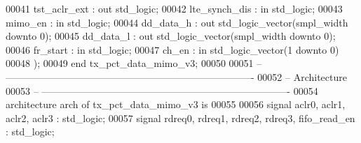 \begin{DoxyCode}
00041           \textcolor{vhdlchar}{tst_aclr_ext}          \textcolor{vhdlchar}{:} \textcolor{keywordflow}{out} \textcolor{comment}{std\_logic};
00042           \textcolor{vhdlchar}{lte_synch_dis}     \textcolor{vhdlchar}{:} \textcolor{keywordflow}{in} \textcolor{comment}{std\_logic};
00043           \textcolor{vhdlchar}{mimo_en}           \textcolor{vhdlchar}{:} \textcolor{keywordflow}{in} \textcolor{comment}{std\_logic};
00044           \textcolor{vhdlchar}{dd_data_h}         \textcolor{vhdlchar}{:} \textcolor{keywordflow}{out} \textcolor{comment}{std\_logic\_vector}\textcolor{vhdlchar}{(}\textcolor{vhdlchar}{smpl_width} \textcolor{keywordflow}{downto} \textcolor{vhdllogic}{}\textcolor{vhdllogic}{0}\textcolor{vhdlchar}{)};
00045           \textcolor{vhdlchar}{dd_data_l}         \textcolor{vhdlchar}{:} \textcolor{keywordflow}{out} \textcolor{comment}{std\_logic\_vector}\textcolor{vhdlchar}{(}\textcolor{vhdlchar}{smpl_width} \textcolor{keywordflow}{downto} \textcolor{vhdllogic}{}\textcolor{vhdllogic}{0}\textcolor{vhdlchar}{)};
00046           \textcolor{vhdlchar}{fr_start}          \textcolor{vhdlchar}{:} \textcolor{keywordflow}{in} \textcolor{comment}{std\_logic};
00047           \textcolor{vhdlchar}{ch_en}                 \textcolor{vhdlchar}{:} \textcolor{keywordflow}{in} \textcolor{comment}{std\_logic\_vector}\textcolor{vhdlchar}{(}\textcolor{vhdllogic}{}\textcolor{vhdllogic}{1} \textcolor{keywordflow}{downto} \textcolor{vhdllogic}{}\textcolor{vhdllogic}{0}\textcolor{vhdlchar}{)}
00048         \textcolor{vhdlchar}{)};
00049 \textcolor{keywordflow}{end} \textcolor{vhdlchar}{tx\_pct\_data\_mimo\_v3};
00050 
00051 \textcolor{keyword}{-- ----------------------------------------------------------------------------}
00052 \textcolor{keyword}{-- Architecture}
00053 \textcolor{keyword}{-- ----------------------------------------------------------------------------}
00054 \textcolor{keywordflow}{architecture} arch \textcolor{keywordflow}{of} tx_pct_data_mimo_v3 is
00055   
00056   \textcolor{keywordflow}{signal} \textcolor{vhdlchar}{aclr0}\textcolor{vhdlchar}{,} \textcolor{vhdlchar}{aclr1}\textcolor{vhdlchar}{,} \textcolor{vhdlchar}{aclr2}\textcolor{vhdlchar}{,} \textcolor{vhdlchar}{aclr3}          \textcolor{vhdlchar}{:} \textcolor{comment}{std\_logic};
00057   \textcolor{keywordflow}{signal} \textcolor{vhdlchar}{rdreq0}\textcolor{vhdlchar}{,} \textcolor{vhdlchar}{rdreq1}\textcolor{vhdlchar}{,} \textcolor{vhdlchar}{rdreq2}\textcolor{vhdlchar}{,} \textcolor{vhdlchar}{rdreq3}\textcolor{vhdlchar}{,} \textcolor{vhdlchar}{fifo_read_en}      \textcolor{vhdlchar}{:} \textcolor{comment}{std\_logic};

\end{DoxyCode}
